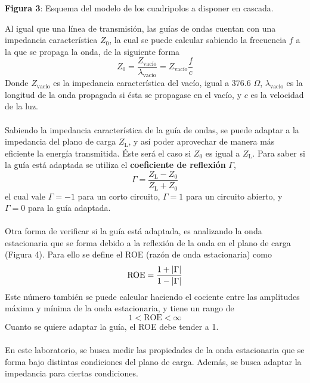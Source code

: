 \documentclass[11pt,a4paper]{article}
\DeclarePairedDelimiter\abs{\lvert}{\rvert}%
\begin{document}
\begin{multicols}{2}
\begin{center}
\textbf{Figura 3}: Esquema del modelo de los cuadripolos a disponer en cascada.
\end{center}
Al igual que una línea de transmisión, las guías de ondas cuentan con una impedancia característica $Z_0$, la cual se puede calcular sabiendo la frecuencia $f$ a la que se propaga la onda, de la siguiente forma
\begin{equation}
    Z_0=\frac{Z_\text{vacío}}{\lambda_\text{vacío}}=Z_\text{vacío}\frac{f}{c}
\end{equation}
Donde $Z_\text{vacío}$ es la impedancia característica del vacío, igual a $376.6$ $\Omega$, $\lambda_\text{vacío}$ es la longitud de la onda propagada si ésta se propagase en el vacío, y $c$ es la velocidad de la luz.\\ \\
Sabiendo la impedancia característica de la guía de ondas, se puede adaptar a la impedancia del plano de carga $Z_\text{L}$, y así poder aprovechar de manera más eficiente la energía transmitida. Éste será el caso si $Z_0$ es igual a $Z_\text{L}$. Para saber si la guía está adaptada se utiliza el \textbf{coeficiente de reflexión} $\Gamma$,
\begin{equation}
    \Gamma = \frac{Z_\text{L}-Z_0}{Z_\text{L}+Z_0}
\end{equation}
el cual vale $\Gamma = -1$ para un corto circuito, $\Gamma = 1$ para un circuito abierto, y $\Gamma = 0$ para la guía adaptada. \\ \\ 
Otra forma de verificar si la guía está adaptada, es analizando la onda estacionaria que se forma debido a la reflexión de la onda en el plano de carga (Figura 4).
Para ello se define el ROE (razón de onda estacionaria) como
\begin{equation}
    \text{ROE} = \frac{1+\abs{\Gamma}}{1-\abs{\Gamma}}
\end{equation}
Este número también se puede calcular haciendo el cociente entre las amplitudes máxima y mínima de la onda estacionaria, y tiene un rango de 
$$
1<\text{ROE} < \infty
$$
Cuanto se quiere adaptar la guía, el ROE debe tender a 1. \\ \\
En este laboratorio, se busca medir las propiedades de la onda estacionaria que se forma bajo distintas condiciones del plano de carga. Además, se busca adaptar la impedancia para ciertas condiciones. 

\end{multicols}
\end{document}
